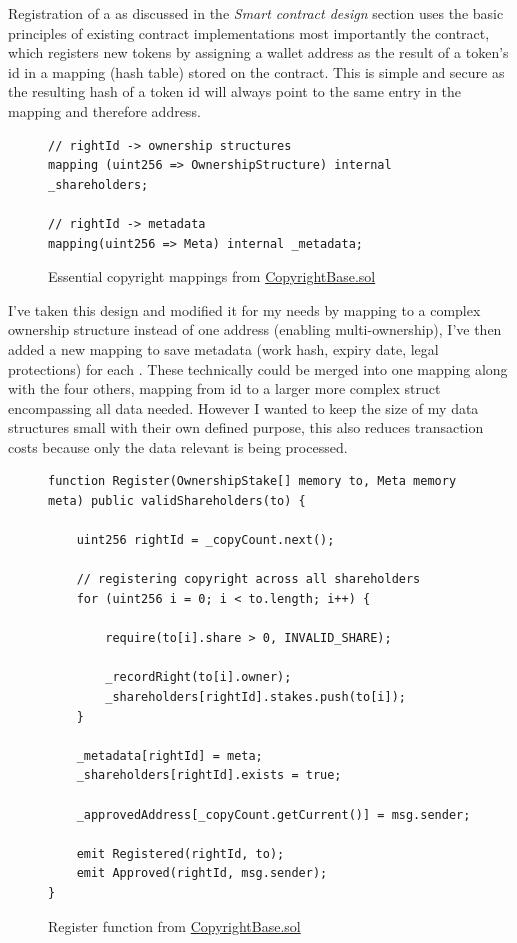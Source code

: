 Registration of a  as discussed in the \textit{Smart contract design} section uses the basic principles of existing contract implementations most importantly the \nft contract, which registers new tokens by assigning a wallet address as the result of a token's id in a mapping (hash table) stored on the contract. This is simple and secure as the resulting hash of a token id will always point to the same entry in the mapping and therefore address.

\begin{figure}[H]
\caption{Essential copyright mappings from \href{https://github.com/MrHarrisonBarker/CRPL/blob/main/CRPL.Contracts/contracts/Copyrights/CopyrightBase.sol}{CopyrightBase.sol}}
\centering
\begin{lstlisting}[language=Solidity]
// rightId -> ownership structures
mapping (uint256 => OwnershipStructure) internal _shareholders;
    
// rightId -> metadata
mapping(uint256 => Meta) internal _metadata;
\end{lstlisting}
\end{figure}

I've taken this design and modified it for my needs by mapping to a complex ownership structure instead of one address (enabling multi-ownership), I've then added a new mapping to save metadata (work hash, expiry date, legal protections) for each . These technically could be merged into one mapping along with the four others, mapping from id to a larger more complex struct encompassing all data needed. However I wanted to keep the size of my data structures small with their own defined purpose, this also reduces transaction costs because only the data relevant is being processed.

\begin{figure}[H]
\caption{Register function from \href{https://github.com/MrHarrisonBarker/CRPL/blob/main/CRPL.Contracts/contracts/Copyrights/CopyrightBase.sol}{CopyrightBase.sol}}
\centering
\begin{lstlisting}[language=Solidity]
function Register(OwnershipStake[] memory to, Meta memory meta) public validShareholders(to) {
	
	uint256 rightId = _copyCount.next();

	// registering copyright across all shareholders
	for (uint256 i = 0; i < to.length; i++) {

		require(to[i].share > 0, INVALID_SHARE);

		_recordRight(to[i].owner);
		_shareholders[rightId].stakes.push(to[i]);
	}
        
	_metadata[rightId] = meta;
	_shareholders[rightId].exists = true;
        
	_approvedAddress[_copyCount.getCurrent()] = msg.sender;

	emit Registered(rightId, to);
	emit Approved(rightId, msg.sender);
}	
\end{lstlisting}
\end{figure}

